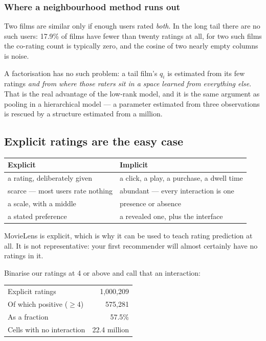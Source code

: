 \documentclass[11pt,a4paper]{article}
\begin{document}
\subsubsection{Where a neighbourhood method runs out}

Two films are similar only if enough users rated \emph{both}. In the long tail
there are no such users: 17.9\% of films have fewer than twenty ratings at all,
for two such films the co-rating count is typically zero, and the cosine of two
nearly empty columns is noise.

\begin{keybox}[title={Borrowing strength}]
A factorisation has no such problem: a tail film's $q_i$ is estimated from its
few ratings \emph{and from where those raters sit in a space learned from
everything else}. That is the real advantage of the low-rank model, and it is
the same argument as pooling in a hierarchical model --- a parameter estimated
from three observations is rescued by a structure estimated from a million.
\end{keybox}

\subsection{Explicit ratings are the easy case}

\begin{center}
\small
\begin{tabular}{p{}p{}}
\toprule
\textbf{Explicit} & \textbf{Implicit} \\
\midrule
a rating, deliberately given & a click, a play, a purchase, a dwell time \\
scarce --- most users rate nothing & abundant --- every interaction is one \\
a scale, with a middle & presence or absence \\
a stated preference & a revealed one, plus the interface \\
\bottomrule
\end{tabular}
\end{center}

MovieLens is explicit, which is why it can be used to teach rating prediction
at all. It is not representative: your first recommender will almost certainly
have no ratings in it.

Binarise our ratings at 4 or above and call that an interaction:

\begin{center}
\small
\begin{tabular}{lr}
\toprule
Explicit ratings           & 1{,}000{,}209 \\
Of which positive ($\ge 4$) & 575{,}281 \\
As a fraction              & 57.5\% \\
Cells with no interaction  & 22.4 million \\
\bottomrule
\end{tabular}
\end{center}
\end{document}
